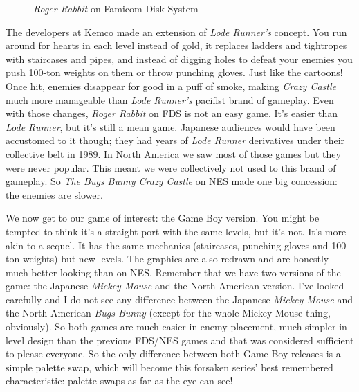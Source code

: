 \documentclass{book}
\begin{document}
\FloatBarrier\vspace{\baselineskip}\begin{figure}[H]\caption*{\emph{Roger Rabbit} on Famicom Disk System}\end{figure}
The developers at Kemco made an extension of \emph{Lode Runner’s} concept. You run around for hearts in each level instead of gold, it replaces ladders and tightropes with staircases and pipes, and instead of digging holes to defeat your enemies you push 100-ton weights on them or throw punching gloves. Just like the cartoons! Once hit, enemies disappear for good in a puff of smoke, making \emph{Crazy Castle} much more manageable than \emph{Lode Runner’s} pacifist brand of gameplay. Even with those changes, \emph{Roger Rabbit} on FDS is not an easy game. It’s easier than \emph{Lode Runner}, but it’s still a mean game. Japanese audiences would have been accustomed to it though; they had years of \emph{Lode Runner} derivatives under their collective belt in 1989. In North America we saw most of those games but they were never popular. This meant we were collectively not used to this brand of gameplay. So \emph{The Bugs Bunny Crazy Castle} on NES made one big concession: the enemies are slower.\par
\FloatBarrier\vspace{\baselineskip}\begin{figure}[H]\end{figure}
We now get to our game of interest: the Game Boy version. You might be tempted to think it’s a straight port with the same levels, but it’s not. It’s more akin to a sequel. It has the same mechanics (staircases, punching gloves and 100 ton weights) but new levels. The graphics are also redrawn and are honestly much better looking than on NES. Remember that we have two versions of the game: the Japanese \emph{Mickey Mouse} and the North American version. I’ve looked carefully and I do not see any difference between the Japanese \emph{Mickey Mouse} and the North American \emph{Bugs Bunny} (except for the whole Mickey Mouse thing, obviously). So both games are much easier in enemy placement, much simpler in level design than the previous FDS/NES games and that was considered sufficient to please everyone. So the only difference between both Game Boy releases is a simple palette swap, which will become this forsaken series’ best remembered characteristic: palette swaps as far as the eye can see!\par
\end{document}
